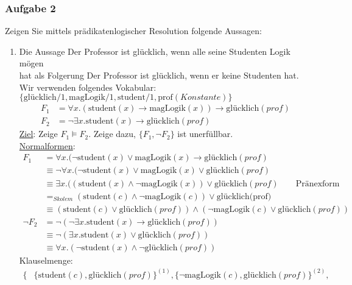 \subsubsection*{Aufgabe 2}
Zeigen Sie mittels prädikatenlogischer Resolution folgende Aussagen: 
\begin{enumerate}
\item Die Aussage \glqq Der Professor ist glücklich, wenn alle seine Studenten Logik mögen\grqq \\
hat als Folgerung \glqq Der Professor ist glücklich, wenn er keine Studenten hat\grqq. \\
\LOES Wir verwenden folgendes Vokabular: $\{\text{glücklich}/1, \text{magLogik}/1, \text{student}/1, \text{prof}(Konstante)\}$ 
\begin{align*}
F_1 &= \forall x.(\text{student}(x) \to \text{magLogik}(x)) \to \text{glücklich}(prof) \\
F_2 &= \neg \exists x.\text{student}(x) \to \text{glücklich}(prof)
\end{align*} 
\underline{Ziel}: Zeige $F_1 \models F_2$. Zeige dazu, $\{F_1, \neg F_2\}$ ist unerfüllbar. \\
\underline{Normalformen}: 
\begin{align*}
F_1 &= \forall x.(\neg\text{student}(x) \lor \text{magLogik}(x) \to \text{glücklich}(prof) \\
&\equiv \neg \forall x.(\neg \text{student}(x) \lor \text{magLogik}(x) \lor \text{glücklich}(prof) \\
&\equiv \exists x.((\text{student}(x) \land \neg \text{magLogik}(x)) \lor \text{glücklich}(prof) \qquad \text{Pränexform} \\
&=_{Skolem} (\text{student}(c) \land \neg \text{magLogik}(c)) \lor \text{glücklich(prof)} \\ 
&\equiv (\text{student}(c) \lor \text{glücklich}(prof)) \land (\neg \text{magLogik}(c) \lor \text{glücklich}(prof)) \\
\neg F_2 &= \neg (\neg \exists x.\text{student}(x) \to \text{glücklich}(prof)) \\
&\equiv \neg (\exists x.\text{student}(x) \lor \text{glücklich}(prof)) \\
&\equiv \forall x.(\neg \text{student}(x) \land \neg \text{glücklich}(prof))
\end{align*}
Klauselmenge: 
\begin{align*}
\{&\{\text{student}(c), \text{glücklich}(prof)\}^{(1)}, \{\neg\text{magLogik}(c),\text{glücklich}(prof)\}^{(2)}, \\ 

\end{align*}
\end{enumerate}
